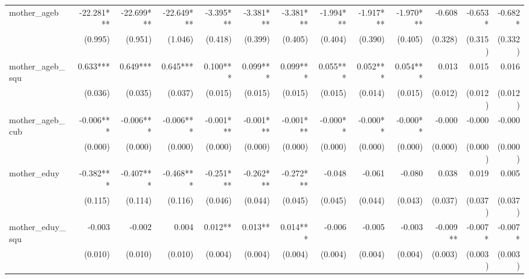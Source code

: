 \begin{tabular}{lrrrrrrrrrrrr}
mother\_ageb                                &   -22.281*** &   -22.699*** &   -22.649*** &    -3.395*** &    -3.381*** &    -3.381*** &    -1.994*** &    -1.917*** &    -1.970*** &       -0.608 &      -0.653* &      -0.682* \\ 
                                            &      (0.995) &      (0.951) &      (1.046) &      (0.418) &      (0.399) &      (0.405) &      (0.404) &      (0.390) &      (0.405) &      (0.328) &      (0.315) &      (0.332) \\ 
mother\_ageb\_squ                           &     0.633*** &     0.649*** &     0.645*** &     0.100*** &     0.099*** &     0.099*** &     0.055*** &     0.052*** &     0.054*** &        0.013 &        0.015 &        0.016 \\ 
                                            &      (0.036) &      (0.035) &      (0.037) &      (0.015) &      (0.015) &      (0.015) &      (0.015) &      (0.014) &      (0.015) &      (0.012) &      (0.012) &      (0.012) \\ 
mother\_ageb\_cub                           &    -0.006*** &    -0.006*** &    -0.006*** &    -0.001*** &    -0.001*** &    -0.001*** &     -0.000** &     -0.000** &     -0.000** &       -0.000 &       -0.000 &       -0.000 \\ 
                                            &      (0.000) &      (0.000) &      (0.000) &      (0.000) &      (0.000) &      (0.000) &      (0.000) &      (0.000) &      (0.000) &      (0.000) &      (0.000) &      (0.000) \\ 
mother\_eduy                                &    -0.382*** &    -0.407*** &    -0.468*** &    -0.251*** &    -0.262*** &    -0.272*** &       -0.048 &       -0.061 &       -0.080 &        0.038 &        0.019 &        0.005 \\ 
                                            &      (0.115) &      (0.114) &      (0.116) &      (0.046) &      (0.044) &      (0.045) &      (0.045) &      (0.044) &      (0.043) &      (0.037) &      (0.037) &      (0.037) \\ 
mother\_eduy\_squ                           &       -0.003 &       -0.002 &        0.004 &      0.012** &      0.013** &     0.014*** &       -0.006 &       -0.005 &       -0.003 &     -0.009** &      -0.007* &      -0.007* \\ 
                                            &      (0.010) &      (0.010) &      (0.010) &      (0.004) &      (0.004) &      (0.004) &      (0.004) &      (0.004) &      (0.004) &      (0.003) &      (0.003) &      (0.003) \\ 

\end{tabular}
